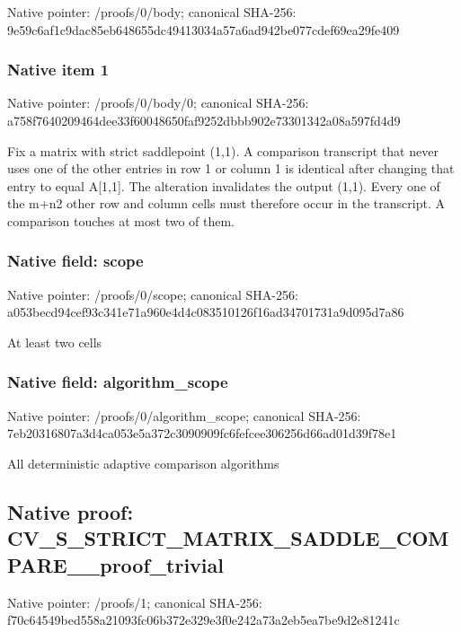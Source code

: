 \documentclass[10pt,a4paper]{article}
\begin{document}
Native pointer: /proofs/0/body; canonical SHA-256: 9e59c6af1c9dac85eb648655\allowbreak{}dc49413034a57a6ad942be07\allowbreak{}7cdef69ea29fe409



\subsubsection{Native item 1}


Native pointer: /proofs/0/body/0; canonical SHA-256: a758f7640209464dee33f600\allowbreak{}48650faf9252dbbb902e7330\allowbreak{}1342a08a597fd4d9


Fix a matrix with strict saddlepoint (1,1). A comparison transcript that never uses one of the other entries in row 1 or column 1 is identical after changing that entry to equal A[1,1]. The alteration invalidates the output (1,1). Every one of the m+n2 other row and column cells must therefore occur in the transcript. A comparison touches at most two of them.


\subsubsection{Native field: scope}


Native pointer: /proofs/0/scope; canonical SHA-256: a053becd94cef93c341e71a9\allowbreak{}60e4d4c083510126f16ad347\allowbreak{}01731a9d095d7a86


At least two cells


\subsubsection{Native field: algorithm\_scope}


Native pointer: /proofs/0/algorithm\_scope; canonical SHA-256: 7eb20316807a3d4ca053e5a3\allowbreak{}72c3090909fc6fefcee30625\allowbreak{}6d66ad01d39f78e1


All deterministic adaptive comparison algorithms


\subsection{Native proof: CV\_S\_STRICT\_MATRIX\_SADDL\allowbreak{}E\_COMPARE\_\_proof\_trivial}


Native pointer: /proofs/1; canonical SHA-256: f70c64549bed558a21093fc0\allowbreak{}6b372e329e3f0e242a73a2eb\allowbreak{}5ea7be9d2e81241c
\end{document}
